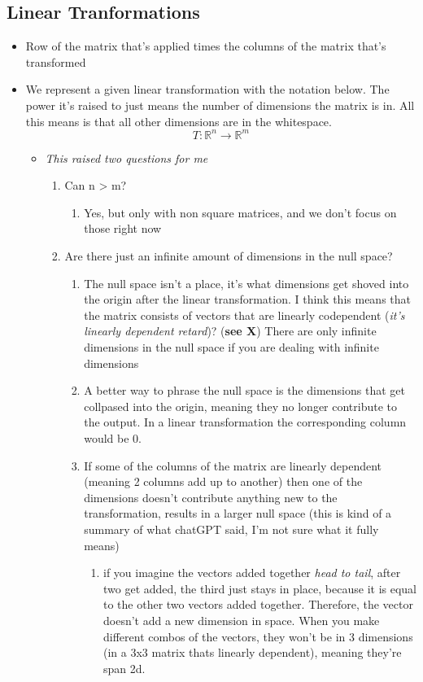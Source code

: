 \documentclass[11pt]{article}
\begin{document}
\subsection{Linear Tranformations}
\label{sec:org35e5ef7}
\begin{itemize}
\item Row of the matrix that's applied times the columns of the matrix that's transformed
\item We represent a given linear transformation with the notation below. The power it's raised to just means the number of dimensions the matrix is in. All this means is that all other dimensions are in the whitespace.
\[
        T : \mathbb{R}^n \to \mathbb{R}^m
        \]
\begin{itemize}
\item \emph{This raised two questions for me}
\begin{enumerate}
\item Can n > m?
\begin{enumerate}
\item Yes, but only with non square matrices, and we don't focus on those right now
\end{enumerate}
\item Are there just an infinite amount of dimensions in the null space?
\begin{enumerate}
\item The null space isn't a place, it's what dimensions get shoved into the origin after the linear transformation. I think this means that the matrix consists of vectors that are linearly codependent (\emph{it's linearly dependent retard})? (\textbf{see X}) There are only infinite dimensions in the null space if you are dealing with infinite dimensions
\item A better way to phrase the null space is the dimensions that get collpased into the origin, meaning they no longer contribute to the output. In a linear transformation the corresponding column would be 0.
\item If some of the columns of the matrix are linearly dependent (meaning 2 columns add up to another) then one of the dimensions doesn't contribute anything new to the transformation, results in a larger null space (this is kind of a summary of what chatGPT said, I'm not sure what it fully means)
\begin{enumerate}
\item if you imagine the vectors added together \emph{head to tail}, after two get added, the third just stays in place, because it is equal to the other two vectors added together. Therefore, the vector doesn't add a new dimension in space. When you make different combos of the vectors, they won't be in 3 dimensions (in a 3x3 matrix thats linearly dependent), meaning they're span 2d.

\end{enumerate}
\end{enumerate}
\end{enumerate}
\end{itemize}
\end{itemize}
\end{document}
